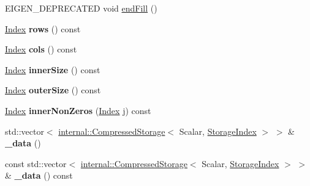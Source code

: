 \begin{DoxyCompactItemize}
\item 
E\+I\+G\+E\+N\+\_\+\+D\+E\+P\+R\+E\+C\+A\+T\+ED void \hyperlink{class_eigen_1_1_dynamic_sparse_matrix_aa806b3dde0a055844110610907b016f3}{end\+Fill} ()
\item 
\mbox{\label{class_eigen_1_1_dynamic_sparse_matrix_a1c2ced5ffb36a58e59235d94d521158c}} 
\hyperlink{group___core___module_a554f30542cc2316add4b1ea0a492ff02}{Index} {\bfseries rows} () const
\item 
\mbox{\label{class_eigen_1_1_dynamic_sparse_matrix_abbdaf1aa19849142248b9ca523248ced}} 
\hyperlink{group___core___module_a554f30542cc2316add4b1ea0a492ff02}{Index} {\bfseries cols} () const
\item 
\mbox{\label{class_eigen_1_1_dynamic_sparse_matrix_a03877f41d99fd28f24a3f9bb97695ec2}} 
\hyperlink{group___core___module_a554f30542cc2316add4b1ea0a492ff02}{Index} {\bfseries inner\+Size} () const
\item 
\mbox{\label{class_eigen_1_1_dynamic_sparse_matrix_aa9fdcceaa71e86fb918ddcf47720bd6f}} 
\hyperlink{group___core___module_a554f30542cc2316add4b1ea0a492ff02}{Index} {\bfseries outer\+Size} () const
\item 
\mbox{\label{class_eigen_1_1_dynamic_sparse_matrix_adc595c5b9e177baaa6b1de9da652ce44}} 
\hyperlink{group___core___module_a554f30542cc2316add4b1ea0a492ff02}{Index} {\bfseries inner\+Non\+Zeros} (\hyperlink{group___core___module_a554f30542cc2316add4b1ea0a492ff02}{Index} j) const
\item 
\mbox{\label{class_eigen_1_1_dynamic_sparse_matrix_ae00bcc84c451a5f4c657fbd6cd3b4600}} 
std\+::vector$<$ \hyperlink{class_eigen_1_1internal_1_1_compressed_storage}{internal\+::\+Compressed\+Storage}$<$ Scalar, \hyperlink{group___sparse_core___module_a0b540ba724726ebe953f8c0df06081ed}{Storage\+Index} $>$ $>$ \& {\bfseries \+\_\+data} ()
\item 
\mbox{\label{class_eigen_1_1_dynamic_sparse_matrix_a90a36beec6fa0baaaf56142b3173bd6c}} 
const std\+::vector$<$ \hyperlink{class_eigen_1_1internal_1_1_compressed_storage}{internal\+::\+Compressed\+Storage}$<$ Scalar, \hyperlink{group___sparse_core___module_a0b540ba724726ebe953f8c0df06081ed}{Storage\+Index} $>$ $>$ \& {\bfseries \+\_\+data} () const

\end{DoxyCompactItemize}
